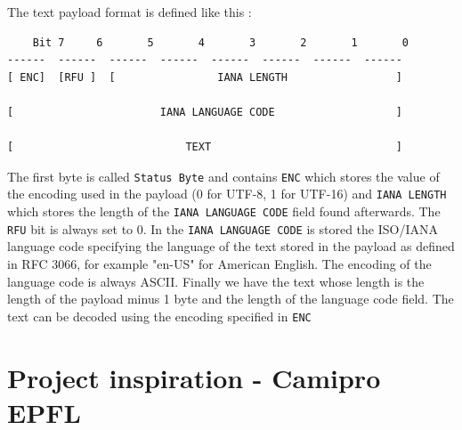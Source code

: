 \documentclass[twoside, openright,11pt,a4paper]{book}
\begin{document}
The text payload format is defined like this\cite{nfc:ndef:doc:text_record} :
\begin{verbatim}
	Bit 7     6       5       4       3       2       1       0
------  ------  ------  ------  ------  ------  ------  ------ 
[ ENC]  [RFU ]  [                IANA LENGTH                 ]  

[                       IANA LANGUAGE CODE                   ]

[                           TEXT                             ]
\end{verbatim}
The first byte is called \verb+Status Byte+ and contains \verb+ENC+ which stores the value of the encoding used in the payload (0 for UTF-8, 1 for UTF-16) and \verb+IANA LENGTH+ which stores the length of the \verb+IANA LANGUAGE CODE+ field found afterwards. The \verb+RFU+ bit is always set to 0. In the \verb+IANA LANGUAGE CODE+ is stored the ISO/IANA language code specifying the language of the text stored in the payload as defined in RFC 3066\cite{rfc:language}, for example "en-US" for American English. The encoding of the language code is always ASCII. Finally we have the text whose length is the length of the payload minus 1 byte and the length of the language code field. The text can be decoded using the encoding specified in \verb+ENC+

\section{Project inspiration - Camipro EPFL}
\end{document}

